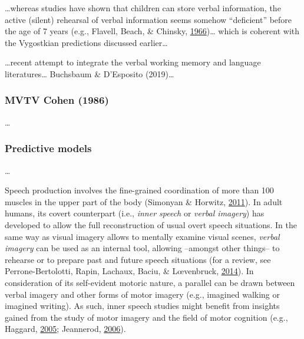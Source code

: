 \documentclass[a4paper,12pt,twoside,openright,oldfontcommands]{memoir}
\begin{document}
\ldots whereas studies have shown that children can store verbal information, the active (silent) rehearsal of verbal information seems somehow \enquote{deficient} before the age of 7 years (e.g., Flavell, Beach, \& Chinsky, \protect\hyperlink{ref-flavell_spontaneous_1966}{1966})\ldots{} which is coherent with the Vygostkian predictions discussed earlier\ldots{}

\ldots recent attempt to integrate the verbal working memory and language literatures\ldots{} Buchsbaum \& D'Esposito (2019)\ldots{}

\hypertarget{mvtv-cohen-1986}{%
\subsubsection{MVTV Cohen (1986)}\label{mvtv-cohen-1986}}

\ldots{}

\hypertarget{predictive-models}{%
\subsubsection{Predictive models}\label{predictive-models}}

\ldots{}

Speech production involves the fine-grained coordination of more than 100 muscles in the upper part of the body (Simonyan \& Horwitz, \protect\hyperlink{ref-simonyan_laryngeal_2011}{2011}). In adult humans, its covert counterpart (i.e., \emph{inner speech} or \emph{verbal imagery}) has developed to allow the full reconstruction of usual overt speech situations. In the same way as visual imagery allows to mentally examine visual scenes, \emph{verbal imagery} can be used as an internal tool, allowing --amongst other things-- to rehearse or to prepare past and future speech situations (for a review, see Perrone-Bertolotti, Rapin, Lachaux, Baciu, \& Lœvenbruck, \protect\hyperlink{ref-Perrone-Bertolotti2014}{2014}). In consideration of its self-evident motoric nature, a parallel can be drawn between verbal imagery and other forms of motor imagery (e.g., imagined walking or imagined writing). As such, inner speech studies might benefit from insights gained from the study of motor imagery and the field of motor cognition (e.g., Haggard, \protect\hyperlink{ref-haggard_conscious_2005}{2005}; Jeannerod, \protect\hyperlink{ref-jeannerod_motor_2006}{2006}).
\end{document}
